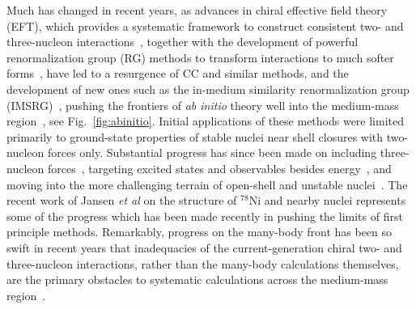 Much has changed in recent years, as advances in chiral effective
field theory (EFT), which provides a systematic framework to construct
consistent two- and three-nucleon
interactions~\cite{vanKolck:1999mw,Epelbaum:2009ve,Epelbaum:2015fb,Machleidt:2011bh,Entem:2003th},
together with the development of powerful renormalization group (RG)
methods to transform interactions to much softer
forms~\cite{Bogner:2010pq,Bogner:2003wn,Bogner:2006vp,Bogner:2006pc},
have led to a resurgence of CC and similar methods, and the
development of new ones such as the in-medium similarity
renormalization group (IMSRG)~\cite{Hergert:2015awm}, pushing the
frontiers of \emph{ab initio} theory well into the medium-mass
region~\cite{Tsukiyama:2011uq,Tsukiyama:2012fk,Bogner:2014tg,Jansen:2014qf,Jansen:2015ngw,Stroberg:2015ymf,Stroberg:2016ung,Soma:2013ys,Soma:2014fu,Soma:2014eu,Hergert:2013ij,Hergert:2014vn,Hergert:2016etg,Wienholtz:2013bh,Hagen:2015ve,jansenprl2016}, see Fig.~\ref{fig:abinitio}. Initial
applications of these methods were limited primarily to ground-state
properties of stable nuclei near shell closures with two-nucleon
forces only. Substantial progress has since been made on including
three-nucleon forces~\cite{Hagen:2007zc,Soma:2013xha,Roth:2012qf,Hergert:2012nb}, targeting excited states and observables besides
energy~\cite{Ekstrom:2014iya,Jansen:2012ey}, and moving into the more
challenging terrain of open-shell and unstable
nuclei~\cite{Tsukiyama:2012fk,Jansen:2014qf,Bogner:2014tg,Stroberg:2015ymf,Stroberg:2016ung,Soma:2013ys,Soma:2012zd,Hergert:2013ij,Gebrerufael:2016xih}. The recent work of Jansen {\em et al} \cite{jansenprl2016} on the structure of $^{78}$Ni and nearby nuclei represents some of the progress which has been made recently in pushing the limits of first principle methods. Remarkably,
progress on the many-body front has been so swift in recent years that
inadequacies of the current-generation chiral two- and three-nucleon
interactions, rather than the many-body calculations themselves, are
the primary obstacles to systematic calculations across the
medium-mass region~\cite{Ekstrom:2015fk,Binder:2014fk}.



